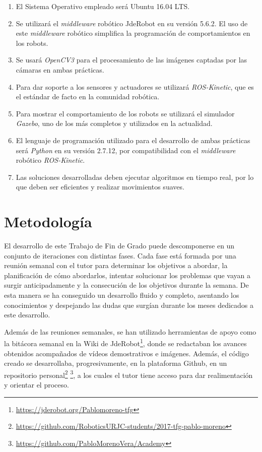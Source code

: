 \begin{enumerate}
	\item El Sistema Operativo empleado será Ubuntu 16.04 LTS.
	\item Se utilizará el \textit{middleware} robótico JdeRobot en su versión 5.6.2. El uso de este \textit{middleware} robótico simplifica la programación de comportamientos en los robots.
	\item Se usará \textit{OpenCV3} para el procesamiento de las imágenes captadas por las cámaras en ambas prácticas.
	\item Para dar soporte a los sensores y actuadores se utilizará \textit{ROS-Kinetic}, que es el estándar de facto en la comunidad robótica.
	\item Para mostrar el comportamiento de los robots se utilizará el simulador \textit{Gazebo}, uno de los más completos y utilizados en la actualidad.
	\item El lenguaje de programación utilizado para el desarrollo de ambas prácticas será \textit{Python} en su versión 2.7.12, por compatibilidad con el \textit{middleware} robótico \textit{ROS-Kinetic}.
	\item Las soluciones desarrolladas deben ejecutar algoritmos en tiempo real, por lo que deben ser eficientes y realizar movimientos suaves.
\end{enumerate}

\section{Metodología}
El desarrollo de este Trabajo de Fin de Grado puede descomponerse en un conjunto de iteraciones con distintas fases. Cada fase está formada por una reunión semanal con el tutor para determinar los objetivos a abordar, la planificación de cómo abordarlos, intentar solucionar los problemas que vayan a surgir anticipadamente y la consecución de los objetivos durante la semana. De esta manera se ha conseguido un desarrollo fluido y completo, asentando los conocimientos y despejando las dudas que surgían durante los meses dedicados a este desarrollo.

Además de las reuniones semanales, se han utilizado herramientas de apoyo como la bitácora semanal en la Wiki de JdeRobot\footnote{\url{https://jderobot.org/Pablomoreno-tfg}}, donde se redactaban los avances obtenidos acompañados de vídeos demostrativos e imágenes. Además, el código creado se desarrollaba, progresivamente, en la plataforma Github, en un repositorio personal\footnote{\url{https://github.com/RoboticsURJC-students/2017-tfg-pablo-moreno}} \footnote{\url{https://github.com/PabloMorenoVera/Academy}}, a los cuales el tutor tiene acceso para dar realimentación y orientar el proceso.

